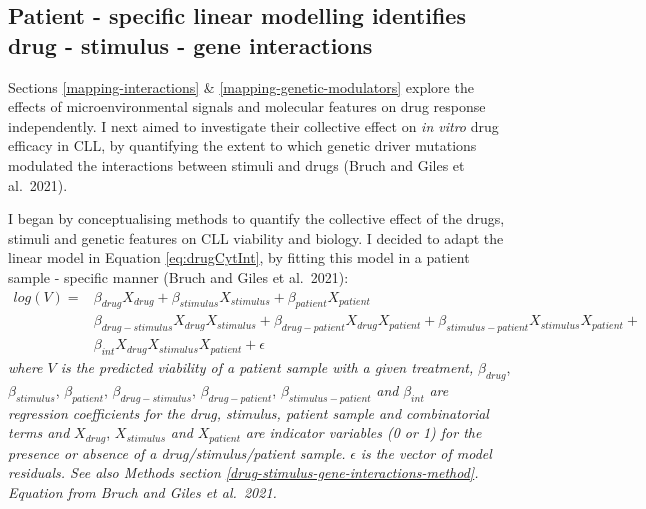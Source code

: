 \documentclass[11pt, a4paper, twosided]{book}
\begin{document}
\hypertarget{patient---specific-linear-modelling-identifies-drug---stimulus---gene-interactions}{%
\subsection{Patient - specific linear modelling identifies drug - stimulus - gene interactions}\label{patient---specific-linear-modelling-identifies-drug---stimulus---gene-interactions}}

Sections \ref{mapping-interactions} \& \ref{mapping-genetic-modulators} explore the effects of microenvironmental signals and molecular features on drug response independently. I next aimed to investigate their collective effect on \emph{in vitro} drug efficacy in CLL, by quantifying the extent to which genetic driver mutations modulated the interactions between stimuli and drugs (Bruch and Giles et al.~2021).

I began by conceptualising methods to quantify the collective effect of the drugs, stimuli and genetic features on CLL viability and biology. I decided to adapt the linear model in Equation \eqref{eq:drugCytInt}, by fitting this model in a patient sample - specific manner (Bruch and Giles et al.~2021):
\begin{equation}
\begin{aligned}
log(V) ={} & \beta_{drug}X_{drug} + \beta_{stimulus}X_{stimulus} + \beta_{patient}X_{patient} \\
           & \beta_{drug-stimulus}X_{drug}X_{stimulus} + \beta_{drug-patient}X_{drug}X_{patient} + \beta_{stimulus-patient}X_{stimulus}X_{patient} + \\
           & \beta_{int}X_{drug}X_{stimulus}X_{patient} + \epsilon
           \label{eq:drugCytGeneInt}
\end{aligned}
\end{equation}
\emph{where \(V\) is the predicted viability of a patient sample with a given treatment,} \(\beta_{drug}\), \(\beta_{stimulus}\), \(\beta_{patient}\), \(\beta_{drug-stimulus}\), \(\beta_{drug-patient}\), \(\beta_{stimulus-patient}\) \emph{and} \(\beta_{int}\) \emph{are regression coefficients for the drug, stimulus, patient sample and combinatorial terms and} \(X_{drug}\), \(X_{stimulus}\) \emph{and} \(X_{patient}\) \emph{are indicator variables (0 or 1) for the presence or absence of a drug/stimulus/patient sample.} \(\epsilon\) \emph{is the vector of model residuals. See also Methods section \ref{drug-stimulus-gene-interactions-method}. Equation from Bruch and Giles et al.~2021.}
\end{document}
